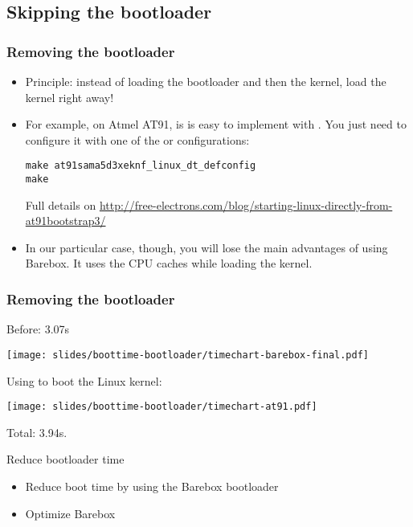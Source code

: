 \subsection{Skipping the bootloader}

\begin{frame}[fragile]
\frametitle{Removing the bootloader}
\begin{itemize}
\item Principle: instead of loading the bootloader and then the kernel,
      load the kernel right away!
\item For example, on Atmel AT91, is is easy to implement with
      . You just need to configure it
      with one of the  or  configurations:
\begin{block}{}
\begin{verbatim}
make at91sama5d3xeknf_linux_dt_defconfig
make
\end{verbatim}
\end{block}
      Full details on
      \url{http://free-electrons.com/blog/starting-linux-directly-from-at91bootstrap3/}

\item In our particular case, though, you will lose the
      main advantages of using Barebox.  It uses the CPU caches
      while loading the kernel.
\end{itemize}
\end{frame}

\begin{frame}
\frametitle{Removing the bootloader}
Before: 3.07s
\begin{center}
    \texttt{[image: slides/boottime-bootloader/timechart-barebox-final.pdf]}
\end{center}
Using  to boot the Linux kernel:
\begin{center}
    \texttt{[image: slides/boottime-bootloader/timechart-at91.pdf]}
\end{center}
Total: 3.94s.
\end{frame}

\setuplabframe
{Reduce bootloader time}
{
\begin{itemize}
\item Reduce boot time by using the Barebox bootloader
\item Optimize Barebox
\end{itemize}
}

